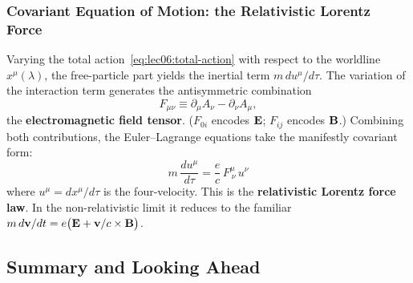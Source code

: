 \subsubsection*{Covariant Equation of Motion: the Relativistic Lorentz Force}

Varying the total action~\eqref{eq:lec06:total-action} with respect to the
worldline $x^\mu(\lambda)$, the free-particle part yields the inertial term
$m\,du^\mu/d\tau$.  The variation of the interaction term generates the
antisymmetric combination
\begin{equation}\label{eq:lec06:field-tensor}
    F_{\mu\nu} \equiv \partial_\mu A_\nu - \partial_\nu A_\mu ,
\end{equation}
the \textbf{electromagnetic field tensor}.  ($F_{0i}$ encodes $\mathbf{E}$;
$F_{ij}$ encodes $\mathbf{B}$.)  Combining both contributions, the
Euler--Lagrange equations take the manifestly covariant form:
\begin{equation}\label{eq:lec06:lorentz-force}
    \boxed{m\,\frac{du^\mu}{d\tau} = \frac{e}{c}\,F^{\mu}_{\ \nu}\,u^\nu}
\end{equation}
where $u^\mu = dx^\mu/d\tau$ is the four-velocity.  This is the
\textbf{relativistic Lorentz force law}.  In the non-relativistic limit
it reduces to the familiar $m\,d\mathbf{v}/dt = e\bigl(\mathbf{E}
+ \mathbf{v}/c\times\mathbf{B}\bigr)$.

\subsection*{Summary and Looking Ahead}

